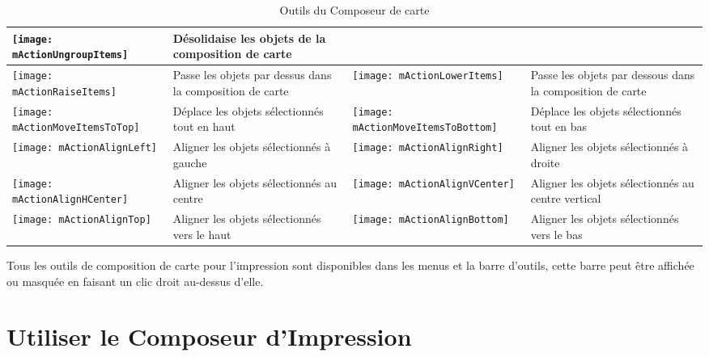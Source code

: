 \begin{table}[p]
\begin{tabular}{|m{1cm}|m{5.4cm}|m{1cm}|m{5.4cm}|}
 \texttt{[image: mActionUngroupItems]} & Désolidaise les objets de la composition de carte \\
\hline \texttt{[image: mActionRaiseItems]} & Passe les objets par dessus dans la composition de carte &
 \texttt{[image: mActionLowerItems]} & Passe les objets par dessous dans la composition de carte \\
\hline \texttt{[image: mActionMoveItemsToTop]} & Déplace les objets sélectionnés tout en haut & 
 \texttt{[image: mActionMoveItemsToBottom]} & Déplace les objets sélectionnés tout en bas \\
 \hline \texttt{[image: mActionAlignLeft]} & Aligner les objets sélectionnés à gauche &
 \texttt{[image: mActionAlignRight]} & Aligner les objets sélectionnés à droite \\
 \hline \texttt{[image: mActionAlignHCenter]} & Aligner les objets sélectionnés au centre &
 \texttt{[image: mActionAlignVCenter]} & Aligner les objets sélectionnés au centre vertical \\
 \hline \texttt{[image: mActionAlignTop]} & Aligner les objets sélectionnés vers le haut &
 \texttt{[image: mActionAlignBottom]} & Aligner les objets sélectionnés  vers le bas \\
\hline
\end{tabular}
\caption{Outils du Composeur de carte}\label{tab:printcomposer_tools}
\end{table}


Tous les outils de composition de carte pour l'impression sont disponibles dans les menus et la barre d'outils, cette barre peut être affichée ou masquée en faisant un clic droit au-dessus d'elle.

\section{Utiliser le Composeur d'Impression}\label{label_useprintcomposer} 

